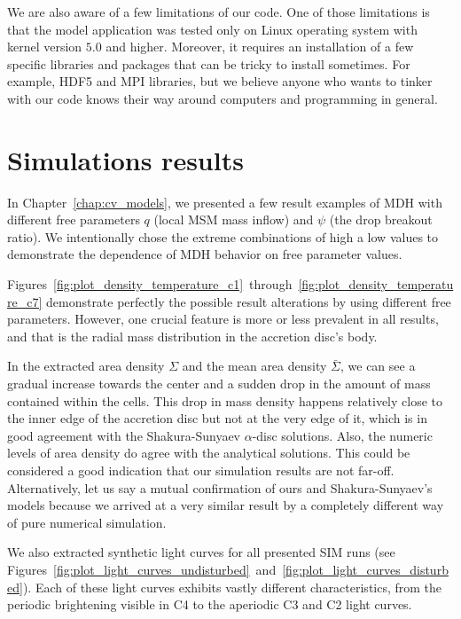     We are also aware of a few limitations of our code. One of those limitations is that the model application was tested only on Linux operating system with kernel version $5.0$ and higher. Moreover, it requires an installation of a few specific libraries and packages that can be tricky to install sometimes. For example, HDF5 and MPI libraries, but we believe anyone who wants to tinker with our code knows their way around computers and programming in general.

\section{Simulations results}
    In Chapter~\ref{chap:cv_models}, we presented a few result examples of MDH with different free parameters $q$ (local MSM mass inflow) and $\psi$ (the drop breakout ratio). We intentionally chose the extreme combinations of high a low values to demonstrate the dependence of MDH behavior on free parameter values. 

    Figures~\ref{fig:plot_density_temperature_c1}~through~\ref{fig:plot_density_temperature_c7} demonstrate perfectly the possible result alterations by using different free parameters. However, one crucial feature is more or less prevalent in all results, and that is the radial mass distribution in the accretion disc's body. 

    In the extracted area density $\Sigma$ and the mean area density $\bar{\Sigma}$, we can see a gradual increase towards the center and a sudden drop in the amount of mass contained within the cells. This drop in mass density happens relatively close to the inner edge of the accretion disc but not at the very edge of it, which is in good agreement with the Shakura-Sunyaev $\alpha$-disc solutions. Also, the numeric levels of area density do agree with the analytical solutions. This could be considered a good indication that our simulation results are not far-off. Alternatively, let us say a mutual confirmation of ours and Shakura-Sunyaev's models because we arrived at a very similar result by a completely different way of pure numerical simulation.

    We also extracted synthetic light curves for all presented SIM runs (see Figures~\ref{fig:plot_light_curves_undisturbed}~and~\ref{fig:plot_light_curves_disturbed}). Each of these light curves exhibits vastly different characteristics, from the periodic brightening visible in C4 to the aperiodic C3 and C2 light curves.  

